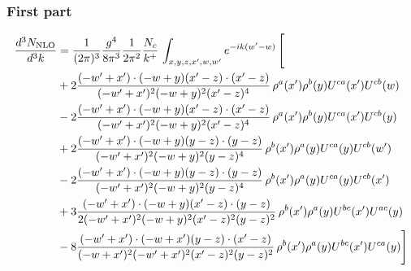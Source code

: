 \documentclass[aps,prd,amsmath,amssymb,nofootinbib]{revtex4-2}
\numberwithin{equation}{section}
\begin{document}
\subsubsection{First part}
\begin{align}
    \frac{d^{3}N_{\rm NLO}}{d^{3}k} & = \frac{1}{(2\pi)^{3}}\frac{g^{4}}{8\pi^{3}}\frac{1}{2\pi^{2}} \frac{N_{c}}{k^{+}}\,\int_{x,y,z,x^{\prime},w,w^{\prime}}e^{-ik(w^{\prime}-w)}\, \Bigg[\notag \\ &  + 2 \frac{( - w' + x') \cdot ( - w + y) (x' - z) \cdot (x' - z)}{( - w' + x')^{2} ( - w + y)^{2} (x' - z)^{4}}\,\rho^{a}(x') \rho^{b}(y) U^{c a}(x') U^{c b}(w)\nonumber\\
    &- 2 \frac{( - w' + x') \cdot ( - w + y) (x' - z) \cdot (x' - z)}{( - w' + x')^{2} ( - w + y)^{2} (x' - z)^{4}}\,\rho^{a}(x') \rho^{b}(y) U^{c a}(x') U^{c b}(y)\nonumber\\
        &+ 2 \frac{( - w' + x') \cdot ( - w + y) (y - z) \cdot (y - z)}{( - w' + x')^{2} ( - w + y)^{2} (y - z)^{4}}\,\rho^{b}(x') \rho^{a}(y) U^{c a}(y) U^{c b}(w')\nonumber\\
    &-2\frac{( - w' + x') \cdot ( - w + y) (y - z) \cdot (y - z)}{( - w' + x')^{2} ( - w + y)^{2} (y - z)^{4}}\,\rho^{b}(x') \rho^{a}(y) U^{c a}(y) U^{c b}(x')\nonumber\\
    &+ 3 \frac{( - w' + x') \cdot ( - w + y) (x' - z) \cdot (y - z)}{2 ( - w' + x')^{2} ( - w + y)^{2} (x' - z)^{2} (y - z)^{2}}\,\rho^{b}(x') \rho^{a}(y) U^{b c}(x') U^{a c}(y) \nonumber\\
    &- 8 \frac{( - w' + x') \cdot ( - w + x') (y - z) \cdot (x' - z)}{( - w + x')^{2} ( - w' + x')^{2} (x' - z)^{2} (y - z)^{2}}\,\rho^{b}(x') \rho^{a}(y) U^{b c}(x') U^{c a}(y) \Bigg]
\end{align}
\end{document}
